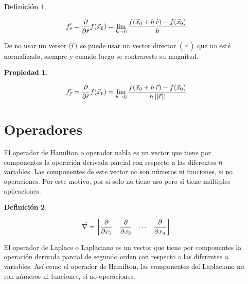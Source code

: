 \documentclass[a5paper,12pt,twoside]{book}
\newtheorem{defn}{{Definición}}[chapter]
\newtheorem{prop}{{Propiedad}}[chapter]
\begin{document}
\begin{mdframed}[style=MyFrame1]
    \begin{defn}
    \end{defn}
    \begin{equation*}
        f_{\hat{r}}'
        = \frac{\partial}{\partial \hat{r}} f(\Vec{x}_0)
        = \lim_{h \to 0} \frac{f(\Vec{x}_0+h\,\hat{r})-f(\Vec{x}_0)}{h}
    \end{equation*}
\end{mdframed}

De no usar un versor $(\hat{r})$ se puede usar un vector director $(\Vec{r})$ que no esté normalizado, siempre y cuando luego se contrareste su magnitud.

\begin{mdframed}[style=MyFrame1]
    \begin{prop}
    \end{prop}
    \begin{equation*}
        f_{\Vec{r}}' = \frac{\partial}{\partial \hat{r}} f(\Vec{x}_0) = \lim_{h \to 0} \dfrac{f(\Vec{x}_0+h\,\Vec{r})-f(\Vec{x}_0)}{h\, {\left|\left| {\Vec{r}} \right|\right|}}
    \end{equation*}
\end{mdframed}


\section{Operadores}

El operador de Hamilton o operador nabla es un vector que tiene por componentes la operación derivada parcial con respecto a las diferentes $n$ variables. Las componentes de este vector no son números ni funciones, si no operaciones. Por este motivo, por si solo no tiene uso pero sí tiene múltiples aplicaciones.

\begin{mdframed}[style=MyFrame1]
    \begin{defn}
    \end{defn}
    \begin{equation*}
        \Vec{\nabla} = \begin{bmatrix} \dfrac{\partial}{\partial x_1} & \dfrac{\partial}{\partial x_2} & \cdots & \dfrac{\partial}{\partial x_n} \end{bmatrix}
    \end{equation*}
\end{mdframed}

El operador de Laplace o Laplaciano es un vector que tiene por componentes la operación derivada parcial de segundo orden con respecto a las diferentes $n$ variables. Así como el operador de Hamilton, las componentes del Laplaciano no son números ni funciones, si no operaciones.
\end{document}
